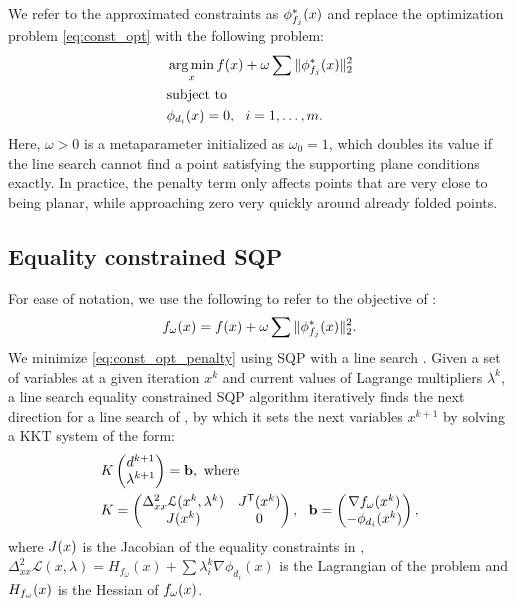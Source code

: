 We refer to the approximated constraints as $\phi^*_{f_j}(x)$ and replace the optimization problem \eqref{eq:const_opt} with the following problem:
\begin{equation} \label{eq:const_opt_penalty}
\begin{aligned}
& \operatorname*{arg\,min}_x f(x) + \omega \sum \|\phi^*_{f_j}(x)\|_2^2 \\
& \textrm{subject to} \\
& \phi_{d_i}(x) = 0, \ \  i = 1, \ldots, m. \\ 
\end{aligned}
\end{equation}
Here, $\omega > 0$ is a metaparameter initialized as $\omega_0 = 1$, which doubles its value if the line search cannot find a point satisfying the supporting plane conditions exactly. In practice, the penalty term only affects points that are very close to being planar, while approaching zero very quickly around already folded points.

\subsection{Equality constrained SQP}
For ease of notation, we use the following to refer to the objective of :
\begin{equation}
f_\omega(x) = f(x) + \omega \sum \|\phi^*_{f_j}(x)\|_2^2.
\end{equation}
We minimize \eqref{eq:const_opt_penalty} using SQP with a line search \cite{nocedal}. Given a set of variables at a given iteration $x^k$ and current values of Lagrange multipliers $\lambda^k$, a line search equality constrained SQP algorithm iteratively finds the next direction for a line search of , by which it sets the next variables $x^{k+1}$ by solving a KKT system of the form:
%
\begin{equation} \label{eq:KKT_eps}
\begin{aligned}
&{K} \begin{pmatrix} d^{k+1} \\ \lambda^{k+1} \end{pmatrix}=\mathbf{b}, \ \text{where} \\
&{K}=\begin{pmatrix}
{\Delta^2_{xx}\mathcal{L}(x^k,\lambda^k)} & {J^\tr}(\x^k)\\
{J(\x^k)} &  0 \\
\end{pmatrix}, \ \ 
\mathbf{b}=\begin{pmatrix}
{\nabla f_\omega(x^k)} \\ 
-\phi_{d_i}(x^k)\\
\end{pmatrix},
\end{aligned}
\end{equation}
%
where $J(x)$ is the Jacobian of the equality constraints in , $\Delta^2_{xx}\mathcal{L}(x,\lambda) = H_{f_\omega}(x)+\sum\lambda_i^{k} \nabla \phi_{d_i}(x)$ is the Lagrangian of the problem and $H_{f_\omega}(x)$ is the Hessian of $f_\omega(x)$.

